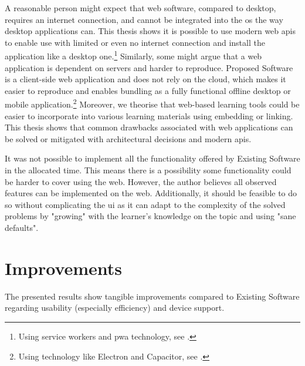 A reasonable person might expect that web software, compared to desktop, requires an internet connection, and cannot be integrated into the \gls{os} the way desktop applications can.
This thesis shows it is possible to use modern web \glspl{api} to enable use with limited or even no internet connection and install the application like a desktop one.\footnote{Using service workers and \gls{pwa} technology, see .}
Similarly, some might argue that a web application is dependent on servers and harder to reproduce.
Proposed Software is a client-side web application and does not rely on the cloud, which makes it easier to reproduce and enables bundling as a fully functional offline desktop or mobile application.\footnote{Using technology like Electron and Capacitor, see .}
Moreover, we theorise that web-based learning tools could be easier to incorporate into various learning materials using embedding or linking.
This thesis shows that common drawbacks associated with web applications can be solved or mitigated with architectural decisions and modern \glspl{api}.

It was not possible to implement all the functionality offered by Existing Software in the allocated time.
This means there is a possibility some functionality could be harder to cover using the web.
However, the author believes all observed features can be implemented on the web.
Additionally, it should be feasible to do so without complicating the \gls{ui} as it can adapt to the complexity of the solved problems by "growing" with the learner's knowledge on the topic and using "sane defaults".

\section{Improvements}

The presented results show tangible improvements compared to Existing Software regarding usability (especially efficiency) and device support.

